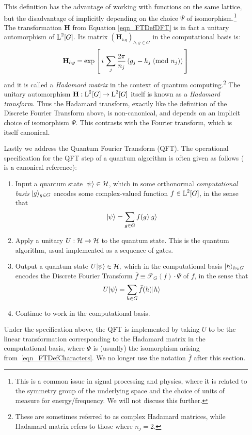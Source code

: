 This definition has the advantage of working with functions on the same lattice, but the disadvantage of implicitly depending on the choice $\Psi$ of isomorphism.\footnote{This is a common issue in signal processing and physics, where it is related to the symmetry group of the underlying space and the choice of units of measure for energy/frequency. We will not discuss this further.} The transformation $\mathbf{H}$ from Equation \ref{eqn_FTDefDFT} is in fact a unitary automorphism of $\operatorname{L}^2[G]$. Its matrix $(\mathbf{H}_{hg})_{h,g \in G}$ in the computational basis is:
\begin{equation} \label{eqn_HadamardMatrixDef}
  \mathbf{H}_{hg} = \exp\left[\, i \, \sum_j \frac{2 \pi}{n_j} \left(\modclass{g_j-h_j}{n_j}\right) \, \right] %
\end{equation}
and it is called a \emph{Hadamard matrix} in the context of quantum computing.\footnote{These are sometimes referred to as complex Hadamard matrices, while Hadamard matrix refers to those where $n_j=2$.} The unitary automorphism $\mathbf{H}:\operatorname{L}^2[G] \rightarrow \operatorname{L}^2[G]$ itself is known as a \emph{Hadamard transform}. Thus the Hadamard transform, exactly like the definition of the Discrete Fourier Transform above, is non-canonical, and depends on an implicit choice of isomorphism $\Psi$. This contrasts with the Fourier transform, which is itself canonical.

Lastly we address the Quantum Fourier Transform (QFT). The operational specification for the QFT step of a quantum algorithm is often given as follows (\cite{nielsen2010quantum} is a canonical reference):
\begin{enumerate}
  \item[1.] Input a quantum state $| \psi \rangle \in \mathcal{H}$, which in some orthonormal \textit{computational basis} $| g \rangle_{g\in G}$ encodes some complex-valued function $f \in \operatorname{L}^2[G]$, in the sense that 
    \begin{equation*}
      | \psi \rangle = \sum_{g\in G} f(g) | g \rangle
    \end{equation*}
  \item[2.] Apply a unitary $U : \mathcal{H} \rightarrow \mathcal{H}$ to the quantum state. This is the quantum algorithm, usual implemented as a sequence of gates.
  \item[3.] Output a quantum state $U| \psi \rangle \in \mathcal{H}$, which in the computational basis $| h \rangle_{h\in G}$ encodes the Discrete Fourier Transform $\bar{f} \equiv \mathcal{F}_G(f) \cdot \Psi$ of $f$, in the sense that 
    \begin{equation*}
      U | \psi \rangle = \sum_{h\in G} \bar{f}(h)| h \rangle
    \end{equation*}
  \item[4.] Continue to work in the computational basis.
\end{enumerate}
Under the specification above, the QFT is implemented by taking $U$ to be the linear transformation corresponding to the Hadamard matrix in the computational basis, where $\Psi$ is (usually) the isomorphism arising from~\eqref{eqn_FTDefCharacters}. We no longer use the notation $\bar{f}$ after this section.

